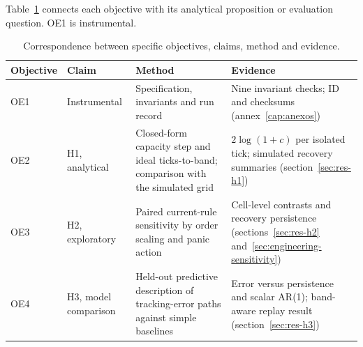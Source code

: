 Table~\ref{tab:oe-h} connects each objective with its analytical proposition or evaluation question. OE1 is instrumental.

\begin{table}[H]
\centering
\caption{Correspondence between specific objectives, claims, method and evidence.}
\label{tab:oe-h}
\footnotesize
\setlength{\tabcolsep}{3pt}
\renewcommand{\arraystretch}{1.0}
\begin{tabularx}{\textwidth}{@{}l l >{\raggedright\arraybackslash}X >{\raggedright\arraybackslash}X@{}}
\toprule
Objective & Claim & Method & Evidence \\
\midrule
OE1 & Instrumental & Specification, invariants and run record & Nine invariant checks; ID and checksums (annex~\ref{cap:anexos}) \\
OE2 & H1, analytical & Closed-form capacity step and ideal ticks-to-band; comparison with the simulated grid & $2\log(1+c)$ per isolated tick; simulated recovery summaries (section~\ref{sec:res-h1}) \\
OE3 & H2, exploratory & Paired current-rule sensitivity by order scaling and panic action & Cell-level contrasts and recovery persistence (sections~\ref{sec:res-h2} and~\ref{sec:engineering-sensitivity}) \\
OE4 & H3, model comparison & Held-out predictive description of tracking-error paths against simple baselines & Error versus persistence and scalar AR(1); band-aware replay result (section~\ref{sec:res-h3}) \\
\bottomrule
\end{tabularx}
\end{table}
